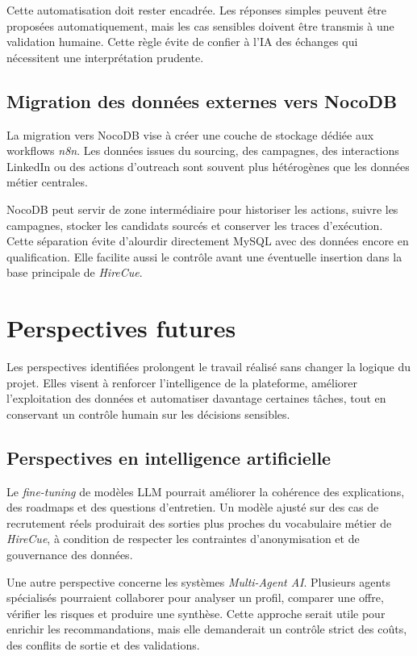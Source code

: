 Cette automatisation doit rester encadrée. Les réponses simples peuvent être proposées automatiquement, mais les cas sensibles doivent être transmis à une validation humaine. Cette règle évite de confier à l'IA des échanges qui nécessitent une interprétation prudente.

\subsection{Migration des données externes vers NocoDB}

La migration vers NocoDB vise à créer une couche de stockage dédiée aux workflows \textit{n8n}. Les données issues du sourcing, des campagnes, des interactions LinkedIn ou des actions d'outreach sont souvent plus hétérogènes que les données métier centrales.

NocoDB peut servir de zone intermédiaire pour historiser les actions, suivre les campagnes, stocker les candidats sourcés et conserver les traces d'exécution. Cette séparation évite d'alourdir directement MySQL avec des données encore en qualification. Elle facilite aussi le contrôle avant une éventuelle insertion dans la base principale de \textit{HireCue}.

\section{Perspectives futures}

Les perspectives identifiées prolongent le travail réalisé sans changer la logique du projet. Elles visent à renforcer l'intelligence de la plateforme, améliorer l'exploitation des données et automatiser davantage certaines tâches, tout en conservant un contrôle humain sur les décisions sensibles.

\subsection{Perspectives en intelligence artificielle}

Le \textit{fine-tuning} de modèles LLM pourrait améliorer la cohérence des explications, des roadmaps et des questions d'entretien. Un modèle ajusté sur des cas de recrutement réels produirait des sorties plus proches du vocabulaire métier de \textit{HireCue}, à condition de respecter les contraintes d'anonymisation et de gouvernance des données.

Une autre perspective concerne les systèmes \textit{Multi-Agent AI}. Plusieurs agents spécialisés pourraient collaborer pour analyser un profil, comparer une offre, vérifier les risques et produire une synthèse. Cette approche serait utile pour enrichir les recommandations, mais elle demanderait un contrôle strict des coûts, des conflits de sortie et des validations.

